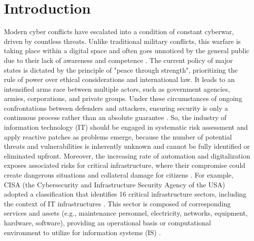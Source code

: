 \chapter*{Introduction}

\label{chap:intro}
\setlength{\parskip}{1em}

Modern cyber conflicts have escalated into a condition of constant cyberwar, driven by countless threats. Unlike traditional military conflicts, this warfare is taking place within a digital space and often goes unnoticed by the general public due to their lack of awareness and competence \cite{almeida2025comparative}. The current policy of major states is dictated by the principle of "peace through strength", prioritizing the rule of power over ethical considerations and international law. It leads to an intensified arms race between multiple actors, such as government agencies, armies, corporations, and private groups. Under these circumstances of ongoing confrontations between defenders and attackers, ensuring security is only a continuous process rather than an absolute guarantee \cite[pp.~4--6]{safitra2023counterattacking}. So, the industry of information technology (IT) should be engaged in systematic risk assessment and apply reactive patches as problems emerge, because the number of potential threats and vulnerabilities is inherently unknown and cannot be fully identified or eliminated upfront. Moreover, the increasing rate of automation and digitalization exposes associated risks for critical infrastructure, where their compromise could create dangerous situations and collateral damage for citizens \cite[pp. 1–2]{nist2018framework}. For example, CISA (the Cybersecurity and Infrastructure Security Agency of the USA) adopted a classification that identifies 16 critical infrastructure sectors, including the context of IT infrastructures \cite[pp. 6–7]{cisa2025infrastructure}. This sector is composed of corresponding services and assets (e.g., maintenance personnel, electricity, networks, equipment, hardware, software), providing an operational basis or computational environment to utilize for information systems (IS) \cite{qatawneh2024mediating}.

